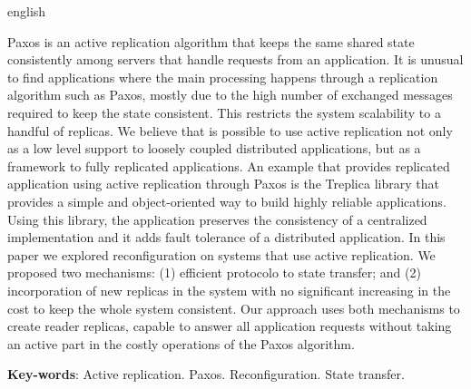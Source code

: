 \begin{resumo}[Abstract]
 \begin{otherlanguage*}{english}

Paxos is an active replication algorithm that keeps the same shared state consistently
among servers that handle requests from an application. It is unusual to find applications
where the main processing happens through a replication algorithm such as Paxos, mostly
due to the high number of exchanged messages required to keep the state consistent. This
restricts the system scalability to a handful of replicas. We believe that is possible to use
active replication not only as a low level support to loosely coupled distributed
applications, but as a framework to fully replicated applications. An example that
provides replicated application using active replication through Paxos is the Treplica
library that provides a simple and object-oriented way to build highly reliable
applications. Using this library, the application preserves the consistency of a
centralized implementation and it adds fault tolerance of a distributed application. In
this paper we explored reconfiguration on systems that use active replication. We proposed
two mechanisms: (1) efficient protocolo to state transfer; and (2) incorporation of new
replicas in the system with no significant increasing in the cost to keep the whole system
consistent. Our approach uses both mechanisms to create reader replicas, capable to answer
all application requests without taking an active part in the costly operations of the
Paxos algorithm.

\textbf{Key-words}: Active replication. Paxos. Reconfiguration. State transfer.

 \end{otherlanguage*}
\end{resumo}

